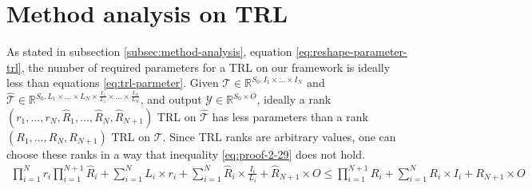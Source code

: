 \documentclass{article}
\begin{document}
\section{Method analysis on TRL}
\label{proof-2}
As stated in subsection \ref{subsec:method-analysis}, equation \ref{eq:reshape-parameter-trl}, the number of required parameters for a TRL on our framework is ideally less than equations \ref{eq:trl-parmeter}. Given $\mathcal{T} \in \mathbb{R}^{S_0, I_1\times\dots\times I_N}$ and $\hat{\mathcal{T}} \in \mathbb{R}^{S_0, L_1\times\dots\times L_N\times \frac{I_1}{L_1}\times\dots\times\frac{I_N}{L_N}}$, and output $\mathcal{Y} \in \mathbb{R}^{S_0\times O}$, ideally a rank $(r_1,\dots,r_N, \hat{R}_1, \dots, \hat{R}_N, \hat{R}_{N+1})$ TRL on $\hat{\mathcal{T}}$ has less parameters than a rank $(R_1,\dots,R_N, R_{N+1})$ TRL on $\mathcal{T}$. Since TRL ranks are arbitrary values, one can choose these ranks in a way that inequality \ref{eq:proof-2-29} does not hold.
\begin{align}
	\label{eq:proof-2-29}
	\prod_{i=1}^{N}r_i \prod_{i=1}^{N+1}\hat{R}_i + \sum_{i=1}^{N}L_i\times r_i + \sum_{i=1}^{N} \hat{R}_i \times \frac{I_i}{L_i} + \hat{R}_{N+1}\times O \leq
	\prod_{i=1}^{N+1}R_i + \sum_{i=1}^{N} R_i\times I_i + R_{N+1}\times O 
\end{align}
\end{document}
